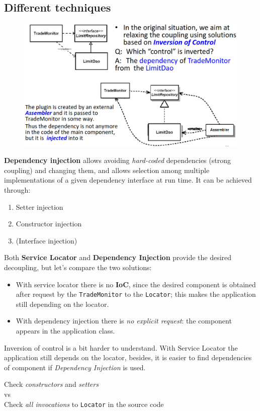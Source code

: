 \subsection{Different techniques}

\begin{figure}[htbp]
   \centering
   \includegraphics{images/dependency_inj.png}
   \label{fig:dependency_inj}
\end{figure}

\textbf{Dependency injection} allows avoiding \textit{hard-coded}
dependencies (strong coupling) and changing them, and allows selection among multiple implementations of a given dependency interface at run time.
It can be achieved through:
\begin{enumerate}
   \item Setter injection
   \item Constructor injection
   \item (Interface injection)
\end{enumerate}

Both \textbf{Service Locator} and \textbf{Dependency Injection} provide
the desired decoupling, but let's compare the two solutions: 
\begin{itemize}
   \item 
   With service locator there is no \textbf{IoC}, since the desired component is obtained
   after request by the \texttt{TradeMonitor} to the \texttt{Locator};
   this makes the application still depending on the locator.
   \item With dependency injection there is \textit{no explicit request}: the
   component appears in the application class.
\end{itemize}
Inversion of control is a bit harder to understand.
With Service Locator the application still depends on the
locator, besides, it is easier to find dependencies of component if \textit{Dependency Injection} is used.
\begin{center}
   \color{darkgray}
   Check \textit{constructors} and \textit{setters}\\vs\\Check \textit{all invocations} to
   \texttt{Locator} in the source code
\end{center}

